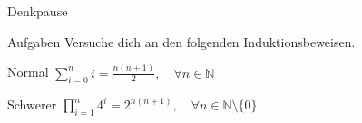 {
\begin{frame}[fragile]{Denkpause}
    \begin{alertblock}{Aufgaben}
        Versuche dich an den folgenden Induktionsbeweisen.
    \end{alertblock}

    \begin{block}{Normal}
        $\displaystyle\sum_{i=0}^{n} i = \frac{n(n+1)}{2}, \quad \forall n \in \mathbb{N}$
    \end{block}
    \begin{block}{Schwerer}
        $\displaystyle\prod_{i=1}^{n} 4^i = 2^{n(n+1)}, \quad \forall n \in \mathbb{N}\setminus \{0\}$
    \end{block}
\end{frame}
}

